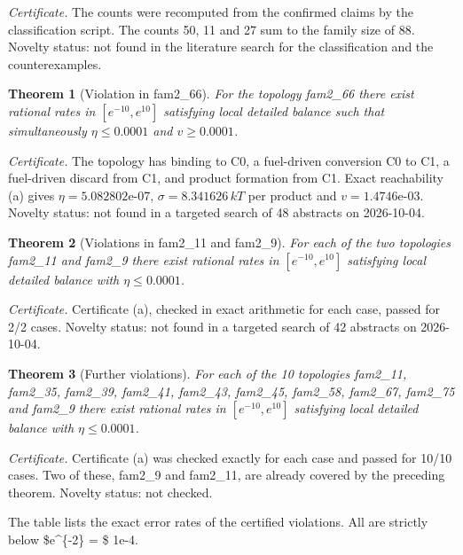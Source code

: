 \documentclass[10pt,twocolumn]{article}
\newtheorem{theorem}{Theorem}\newtheorem{proposition}{Proposition}\newtheorem{lemma}{Lemma}\newtheorem{corollary}{Corollary}
\theoremstyle{definition}\newtheorem{definition}{Definition}\newtheorem{example}{Example}
\begin{document}
\emph{Certificate.} The counts were recomputed from the confirmed claims by the classification script. The counts 50, 11 and 27 sum to the family size of 88. Novelty status: not found in the literature search for the classification and the counterexamples.

\begin{theorem}[Violation in fam2\_66]
For the topology fam2\_66 there exist rational rates in \([e^{-10}, e^{10}]\) satisfying local detailed balance such that simultaneously \(\eta \leq 0.0001\) and \(v \geq 0.0001\).
\end{theorem}

\emph{Certificate.} The topology has binding to C0, a fuel-driven conversion C0 to C1, a fuel-driven discard from C1, and product formation from C1. Exact reachability (a) gives \(\eta = 5.082802\)e-07, \(\sigma = 8.341626\,kT\) per product and \(v = 1.4746\)e-03. Novelty status: not found in a targeted search of 48 abstracts on 2026-10-04.

\begin{theorem}[Violations in fam2\_11 and fam2\_9]
For each of the two topologies fam2\_11 and fam2\_9 there exist rational rates in \([e^{-10}, e^{10}]\) satisfying local detailed balance with \(\eta \leq 0.0001\).
\end{theorem}

\emph{Certificate.} Certificate (a), checked in exact arithmetic for each case, passed for 2/2 cases. Novelty status: not found in a targeted search of 42 abstracts on 2026-10-04.

\begin{theorem}[Further violations]
For each of the 10 topologies fam2\_11, fam2\_35, fam2\_39, fam2\_41, fam2\_43, fam2\_45, fam2\_58, fam2\_67, fam2\_75 and fam2\_9 there exist rational rates in \([e^{-10}, e^{10}]\) satisfying local detailed balance with \(\eta \leq 0.0001\).
\end{theorem}

\emph{Certificate.} Certificate (a) was checked exactly for each case and passed for 10/10 cases. Two of these, fam2\_9 and fam2\_11, are already covered by the preceding theorem. Novelty status: not checked.

The table lists the exact error rates of the certified violations. All are strictly below \$e\^{}\{-2\Delta\} = \$ 1e-4.
\end{document}
